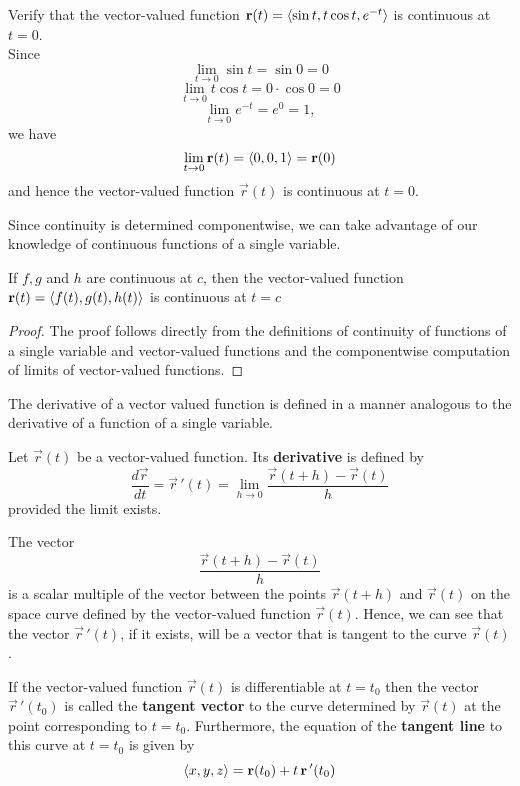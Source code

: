 \documentclass[handout]{ximera}
\begin{document}
\begin{example}[Example 1]
Verify that the vector-valued function $\mathbf r(t) = \left\langle \sin t, t \cos t, e^{-t}\right\rangle$ is continuous at $t = 0$.\\
Since
\[
\lim_{t \to 0} \sin t =  \sin 0 = 0
\]
\[
\lim_{t \to 0} t \cos t =  0 \cdot \cos 0 = 0
\]
\[
\lim_{t \to 0} e^{-t} =  e^0 = 1,
\]
we have
\[
\lim_{t \to 0} \mathbf r(t) = \left\langle 0, 0, 1\right\rangle = \mathbf r(0)
\]
and hence the vector-valued function $\vec r(t)$ is continuous at $t = 0$.

\end{example}

Since continuity is determined componentwise, we can take advantage of our knowledge of 
continuous functions of a single variable.

\begin{proposition}[Continuity]
If $f, g$ and $h$ are continuous at $c$, then the vector-valued function $\mathbf r(t) = \left\langle f(t), g(t), h(t)\right\rangle$
is continuous at $t = c$
\end{proposition}
\begin{proof}
The proof follows directly from the definitions of continuity of functions of a single 
variable and vector-valued functions and the componentwise computation of limits of vector-valued functions.
\end{proof}

The derivative of a vector valued function is defined in a manner analogous to the derivative of a function of a single variable.

\begin{definition}
Let $\vec r(t)$ be a vector-valued function. Its \textbf{derivative} is defined by
\[
\frac{d\vec r}{dt} = \vec r\, '(t) = \lim_{h \to 0} \frac{\vec r(t+h) - \vec r(t)}{h}
\]
provided the limit exists.
\end{definition}

\begin{remark}
The vector 
\[
\frac{\vec r(t+h) - \vec r(t)}{h}
\]
is a scalar multiple of the vector between the points $\vec r(t+h)$ and $\vec r(t)$ on the space 
curve defined by the vector-valued function $\vec r(t)$. 
Hence, we can see that the vector $\vec r\,'(t)$, if it exists, 
will be a vector that is tangent to the curve $\vec r(t)$. 
\end{remark}

\begin{definition}
If the vector-valued function $\vec r(t)$ is differentiable at $t = t_0$ then the vector $\vec r\,'(t_0)$ is called the 
\textbf{tangent vector} to the curve determined by $\vec r(t)$ at the point corresponding to $t = t_0$. 
Furthermore, the equation of the \textbf{tangent line} to this curve at $ t= t_0$ is given by
\[
\left\langle x, y, z\right\rangle = \mathbf r(t_0) + t\,\mathbf r\,'(t_0)
\]
\end{definition}
\end{document}
